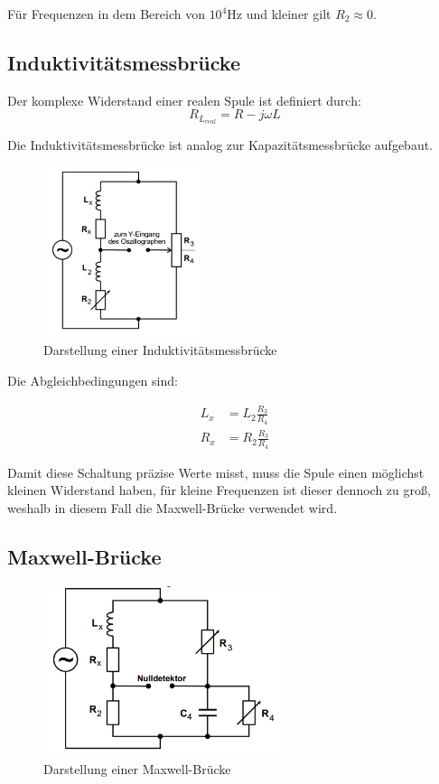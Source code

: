 Für Frequenzen in dem Bereich von $10^4$Hz und kleiner gilt $R_2 \approx 0$.


\subsection{Induktivitätsmessbrücke}
Der komplexe Widerstand einer realen Spule ist definiert durch:
\begin{equation}
  R_{L_{real}} = R - j \omega L
\end{equation}

Die Induktivitätsmessbrücke ist analog zur Kapazitätsmessbrücke aufgebaut.

\begin{figure}[H]
  \centering
  \includegraphics[height=5cm]{induktivitaet.PNG}
  \caption{Darstellung einer Induktivitätsmessbrücke}
  \label{fig:induktivitaet}
\end{figure}

Die Abgleichbedingungen sind:

\begin{align}
  L_x &= L_2 \frac{R_3}{R_4} \\
  R_x &= R_2 \frac{R_3}{R_4}
\end{align}

Damit diese Schaltung präzise Werte misst, muss die Spule einen möglichst kleinen Widerstand haben, für kleine Frequenzen
ist dieser dennoch zu groß, weshalb in diesem Fall die Maxwell-Brücke verwendet wird.

\subsection{Maxwell-Brücke}

\begin{figure}[H]
  \centering
  \includegraphics[height=5cm]{maxwell.PNG}
  \caption{Darstellung einer Maxwell-Brücke}
  \label{fig:maxwell}
\end{figure}

